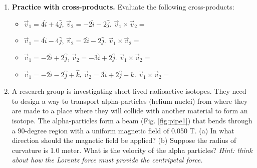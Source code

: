 \documentclass[10pt]{article}
\begin{document}
\begin{enumerate}
\item \textbf{Practice with cross-products.}  Evaluate the following cross-products:
\begin{itemize}
\item $\vec{v}_1 = 4\hat{i}+4\hat{j}$, $\vec{v}_2 = -2\hat{i}-2\hat{j}$.  $\vec{v}_1 \times \vec{v}_2 = $
\item $\vec{v}_1 = 4\hat{i}-4\hat{j}$, $\vec{v}_2 = 2\hat{i}-2\hat{j}$.  $\vec{v}_1 \times \vec{v}_2 = $
\item $\vec{v}_1 = -2\hat{i}+2\hat{j}$, $\vec{v}_2 = -3\hat{i}+2\hat{j}$.  $\vec{v}_1 \times \vec{v}_2 = $
\item $\vec{v}_1 = -2\hat{i}-2\hat{j}+\hat{k}$, $\vec{v}_2 = 3\hat{i}+2\hat{j}-\hat{k}$.  $\vec{v}_1 \times \vec{v}_2 = $
\end{itemize} \vspace{3cm}
\item A research group is investigating short-lived radioactive isotopes. They need to design a way to transport alpha-particles (helium nuclei) from where they are made to a place where they will collide with another material to form an isotope. The alpha-particles form a beam (Fig. \ref{fig:pipe1}) that bends through a 90-degree region with a uniform magnetic field of 0.050 T. (a) In what direction should the magnetic field be applied? (b) Suppose the radius of curvature is 1.0 meter.  What is the velocity of the alpha particles?  \textit{Hint: think about how the Lorentz force must provide the centripetal force.}
\end{enumerate}
\end{document}
